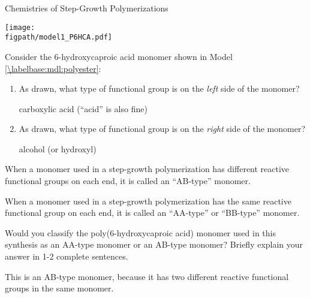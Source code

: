 \begin{activity}{Chemistries of Step-Growth Polymerizations}
\begin{model}
	\centerline{\texttt{[image: \\figpath/model1\_P6HCA.pdf]}}

\end{model}


\begin{ctqs}

	\question Consider the 6-hydroxycaproic acid monomer shown in Model \ref{\labelbase:mdl:polyester}: \label{\labelbase:ctq:label-6hcpa}
	
		\begin{enumerate}
			\item As drawn, what type of functional group is on the \emph{left} side of the monomer?
			
				\begin{solution}[1in]
					carboxylic acid (``acid'' is also fine)
				\end{solution}
			
			\item As drawn, what type of functional group is on the \emph{right} side of the monomer?
			
				\begin{solution}[1in]
					alcohol (or hydroxyl)
				\end{solution}
		\end{enumerate}
		
\end{ctqs}

\begin{infobox}

	When a monomer used in a step-growth polymerization has different reactive functional groups on each end, it is called an ``AB-type'' monomer.
	
	When a monomer used in a step-growth polymerization has the same reactive functional group on each end, it is called an ``AA-type'' or ``BB-type'' monomer.

\end{infobox}

\begin{ctqs}
		
		\question Would you classify the poly(6-hydroxycaproic acid) monomer used in this synthesis as an AA-type monomer or an AB-type monomer?  Briefly explain your answer in 1-2 complete sentences.
			
				\begin{solution}[1.75in]
					This is an AB-type monomer, because it has two different reactive functional groups in the same monomer.
				\end{solution}
		

\end{ctqs}
\end{activity}
